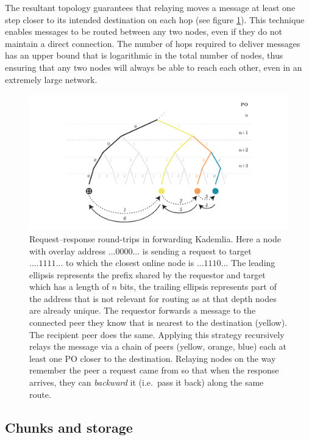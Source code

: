 \documentclass[12pt,a4paper]{article}
\begin{document}
The resultant topology guarantees that relaying moves a message at least one step closer to its intended destination on each hop (see figure \ref{fig:request-response}). This technique enables messages to be routed between any two nodes, even if they do not maintain a direct connection. The number of hops required to deliver messages has an upper bound that is logarithmic in the total number of nodes, thus ensuring that any two nodes will always be able to reach each other, even in an extremely large network.


\begin{figure}[!ht]
   \centering
   \includegraphics[width=\textwidth]{fig2/request-response-forwarding.pdf}
   \caption[Request-response round-trips in forwarding Kademlia]{Request--response round-trips in forwarding Kademlia. Here a node with overlay address $...0000...$ is sending a request to target $....1111...$ to which the closest online node is $...1110...$ The leading ellipsis represents the prefix shared by the requestor and target which has a length of $n$ bits, the trailing ellipsis represents part of the address that is not relevant for routing as at that depth nodes are already unique. The requestor forwards a message to the connected peer they know that is nearest to the destination (yellow). The recipient peer does the same. Applying this strategy recursively relays the message via a chain of peers (yellow, orange, blue) each at least one PO closer to the destination. Relaying nodes on the way remember the peer a request came from so that when the response arrives, they can \emph{backward} it (i.e.\ pass it back) along the same route.}
   \label{fig:request-response}
\end{figure}

\subsection{Chunks and storage}
\end{document}
